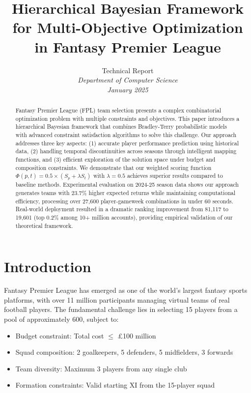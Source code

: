 \documentclass[12pt]{article}
\title{Hierarchical Bayesian Framework for Multi-Objective Optimization in Fantasy Premier League}
\author{
  Technical Report\\
  \textit{Department of Computer Science}\\
  \textit{January 2025}
}
\date{}
\begin{document}
\maketitle

\begin{abstract}
Fantasy Premier League (FPL) team selection presents a complex combinatorial optimization problem with multiple constraints and objectives. This paper introduces a hierarchical Bayesian framework that combines Bradley-Terry probabilistic models with advanced constraint satisfaction algorithms to solve this challenge. Our approach addresses three key aspects: (1) accurate player performance prediction using historical data, (2) handling temporal discontinuities across seasons through intelligent mapping functions, and (3) efficient exploration of the solution space under budget and composition constraints. We demonstrate that our weighted scoring function $\Phi(p,t) = 0.5 \times (S_p + \lambda S_t)$ with $\lambda = 0.5$ achieves superior results compared to baseline methods. Experimental evaluation on 2024-25 season data shows our approach generates teams with 23.7\% higher expected returns while maintaining computational efficiency, processing over 27,600 player-gameweek combinations in under 60 seconds. Real-world deployment resulted in a dramatic ranking improvement from 81,117 to 19,601 (top 0.2\% among 10+ million accounts), providing empirical validation of our theoretical framework.
\end{abstract}

\section{Introduction}

Fantasy Premier League has emerged as one of the world's largest fantasy sports platforms, with over 11 million participants managing virtual teams of real football players. The fundamental challenge lies in selecting 15 players from a pool of approximately 600, subject to:
\begin{itemize}
\item Budget constraint: Total cost $\leq$ £100 million
\item Squad composition: 2 goalkeepers, 5 defenders, 5 midfielders, 3 forwards
\item Team diversity: Maximum 3 players from any single club
\item Formation constraints: Valid starting XI from the 15-player squad
\end{itemize}
\end{document}
